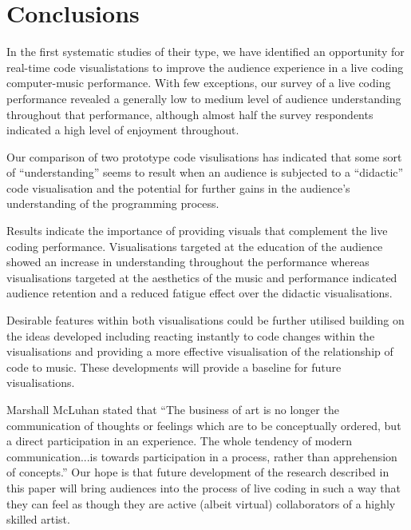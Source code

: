 \documentclass{sig-alternate}
\begin{document}
\section{Conclusions}
In the first systematic studies of their type, we have identified an opportunity for real-time code visualistations to improve the audience experience in a live coding computer-music performance. With few exceptions, our survey of a live coding performance revealed a generally low to medium level of audience understanding throughout that performance, although almost half the survey respondents indicated a high level of enjoyment throughout.

Our comparison of two prototype code visulisations has indicated that some sort of ``understanding'' seems to result when an audience is subjected to a ``didactic'' code visualisation and the potential for further gains in the audience's understanding of the programming process.

Results indicate the importance of providing visuals that complement the live coding performance. Visualisations targeted at the education of the audience showed an increase in understanding throughout the performance whereas visualisations targeted at the aesthetics of the music and performance indicated audience retention and a reduced fatigue effect over the didactic visualisations.

Desirable features within both visualisations could be further utilised building on the ideas developed including reacting instantly to code changes within the visualisations and providing a more effective visualisation of the relationship of code to music. These developments will provide a baseline for future visualisations.

Marshall McLuhan stated that ``The business of art is no longer the communication of thoughts or feelings which are to be conceptually ordered, but a direct participation in an experience. The whole tendency of modern communication...is towards participation in a process, rather than apprehension of concepts.'' \cite{McLuhan} Our hope is that future development of the research described in this paper will bring audiences into the process of live coding in such a way that they can feel as though they are active (albeit virtual) collaborators of a highly skilled artist.




%

\end{document}
